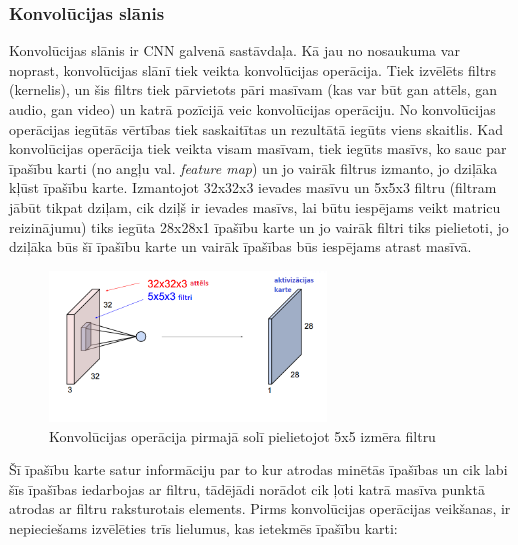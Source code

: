 \subsubsection{Konvolūcijas slānis}
Konvolūcijas slānis ir CNN galvenā sastāvdaļa. Kā jau no nosaukuma var noprast, konvolūcijas slānī tiek veikta konvolūcijas operācija. Tiek izvēlēts filtrs (kernelis), un šis filtrs tiek pārvietots pāri masīvam (kas var būt gan attēls, gan audio, gan video) un katrā pozīcijā veic konvolūcijas operāciju. No konvolūcijas operācijas iegūtās vērtības tiek saskaitītas un rezultātā iegūts viens skaitlis. Kad konvolūcijas operācija tiek veikta visam masīvam, tiek iegūts masīvs, ko sauc par īpašību karti (no angļu val. \textit{feature map}) un jo vairāk filtrus izmanto, jo dziļāka kļūst īpašību karte. Izmantojot 32x32x3 ievades masīvu un 5x5x3 filtru (filtram jābūt tikpat dziļam, cik dziļš ir ievades masīvs, lai būtu iespējams veikt matricu reizinājumu) tiks iegūta 28x28x1 īpašību karte un jo vairāk filtri tiks pielietoti, jo dziļāka būs šī īpašību karte un vairāk īpašības būs iespējams atrast masīvā. 
\begin{figure}[H]%
	\centering
	\includegraphics[height=4cm]{images/ActivationMap.png} %
	\caption{Konvolūcijas operācija pirmajā solī pielietojot 5x5 izmēra filtru}%
	\label{fig:example}%
\end{figure}

Šī īpašību karte satur informāciju par to kur atrodas minētās īpašības un cik labi šīs īpašības iedarbojas ar filtru, tādējādi norādot cik ļoti katrā masīva punktā atrodas ar filtru raksturotais elements. Pirms konvolūcijas operācijas veikšanas, ir nepieciešams izvēlēties trīs lielumus, kas ietekmēs īpašību karti:

